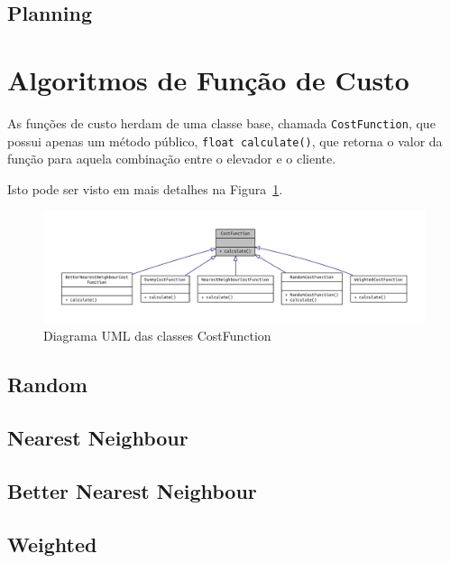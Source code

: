 \subsection{\label{model:schedulers:planning}Planning}
\lipsum[5]

\section{\label{model:costfunctions}Algoritmos de Função de Custo}
As funções de custo herdam de uma classe base, chamada \texttt{CostFunction},
que possui apenas um método público, \texttt{float calculate()}, que retorna o
valor da função para aquela combinação entre o elevador e o cliente.

Isto pode ser visto em mais detalhes na Figura~\ref{fig:model:costfunction:uml:base}.

\begin{figure}[htb]
  \centering
  \includegraphics[scale=0.8]{doc/latex/class_cost_function__inherit__graph}
  \caption{Diagrama UML das classes CostFunction}
  \label{fig:model:costfunction:uml:base}
\end{figure}

\subsection{\label{model:costfunctions:random}Random}
\lipsum[5]

\subsection{\label{model:costfunctions:nn}Nearest Neighbour}
\lipsum[5]

\subsection{\label{model:costfunctions:bnn}Better Nearest Neighbour}
\lipsum[5]

\subsection{\label{model:costfunctions:weighted}Weighted}
\lipsum[5]

